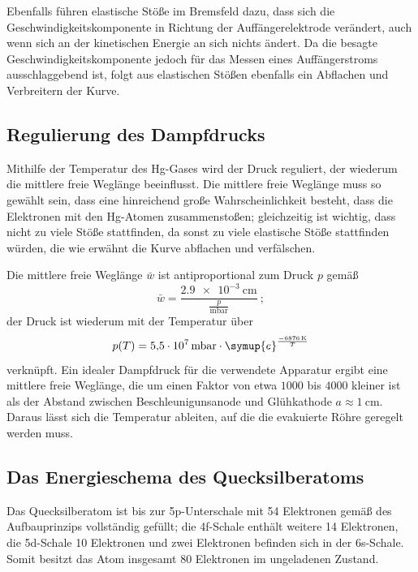 Ebenfalls führen elastische Stöße im Bremsfeld dazu, dass sich die Geschwindigkeitskomponente in Richtung der Auffängerelektrode
verändert, auch wenn sich an der kinetischen Energie an sich nichts ändert. 
Da die besagte Geschwindigkeitskomponente jedoch für das Messen eines Auffängerstroms ausschlaggebend ist, folgt aus elastischen
Stößen ebenfalls ein Abflachen und Verbreitern der Kurve. 

\subsection{Regulierung des Dampfdrucks}
\label{sub:Druck}

Mithilfe der Temperatur des Hg-Gases wird der Druck reguliert, der wiederum die mittlere freie Weglänge beeinflusst. 
Die mittlere freie Weglänge muss so gewählt sein, dass eine hinreichend große Wahrscheinlichkeit besteht, dass die Elektronen 
mit den Hg-Atomen zusammenstoßen; gleichzeitig ist wichtig, dass nicht zu viele Stöße stattfinden, da sonst  
zu viele elastische Stöße stattfinden würden, die wie erwähnt die Kurve abflachen und verfälschen. 

Die mittlere freie Weglänge $\bar{w}$ ist antiproportional zum Druck $p$ gemäß 
\begin{equation}
    \bar{w}=\frac{\SI{2.9e-3}{\centi\meter}}{\frac{p}{\si{\milli\bar}}}\:;
    \label{eqn:Weglänge}
\end{equation}
der Druck ist wiederum mit der Temperatur über 
\begin{equation*}
    p(T)=\SI{5.5e7}{\milli\bar}\cdot \symup{e}^{\frac{\SI{-6876}{\kelvin}}{T}}
\end{equation*}
verknüpft. 
Ein idealer Dampfdruck für die verwendete Apparatur ergibt eine mittlere freie Weglänge, die um einen Faktor von etwa 
$1000$ bis $4000$ kleiner ist als der Abstand zwischen Beschleunigunsanode und Glühkathode $a\approx \SI{1}{\centi\meter}$. 
Daraus lässt sich die Temperatur ableiten, auf die die evakuierte Röhre geregelt werden muss. 

\subsection{Das Energieschema des Quecksilberatoms}

Das Quecksilberatom ist bis zur 5p-Unterschale mit 54 Elektronen gemäß des Aufbauprinzips vollständig gefüllt; 
die 4f-Schale enthält weitere 14 Elektronen, die 5d-Schale 10 Elektronen und zwei Elektronen befinden sich in der 6s-Schale. 
Somit besitzt das Atom insgesamt 80 Elektronen im ungeladenen Zustand. 

